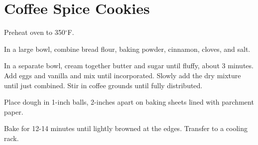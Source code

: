 \section{Coffee Spice Cookies}
\begin{recipe}



	Preheat oven to 350$^{\circ}$F.

	In a large bowl, combine bread flour, baking powder, cinnamon, cloves, and salt.

	In a separate bowl, cream together butter and sugar until fluffy, about 3 minutes. Add eggs and vanilla and mix until incorporated. Slowly add the dry mixture until just combined. Stir in coffee grounds until fully distributed.

	Place dough in 1-inch balls, 2-inches apart on baking sheets lined with parchment paper.

	Bake for 12-14 minutes until lightly browned at the edges. Transfer to a cooling rack.
\end{recipe}

